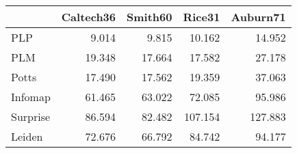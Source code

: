 \begin{tabular}{lrrrr}
\toprule
{} & Caltech36 & Smith60 &  Rice31 & Auburn71 \\
\midrule
PLP      &     9.014 &   9.815 &  10.162 &   14.952 \\
PLM      &    19.348 &  17.664 &  17.582 &   27.178 \\
Potts    &    17.490 &  17.562 &  19.359 &   37.063 \\
Infomap  &    61.465 &  63.022 &  72.085 &   95.986 \\
Surprise &    86.594 &  82.482 & 107.154 &  127.883 \\
Leiden   &    72.676 &  66.792 &  84.742 &   94.177 \\
\bottomrule
\end{tabular}
